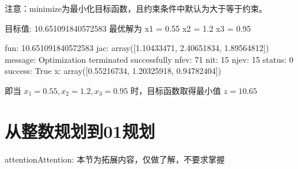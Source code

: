\documentclass[letterpaper,10pt,english]{sphinxmanual}
\begin{document}
注意：minimize为最小化目标函数，且约束条件中默认为大于等于约束。


\begin{sphinxVerbatim}[commandchars=\\\{\}]
  

  
  \PYG{p}{[}\PYG{p}{]}
  \PYG{p}{[}\PYG{p}{]}
  \PYG{p}{[}\PYG{p}{]}
\end{sphinxVerbatim}

\begin{sphinxVerbatim}[commandchars=\\\{\}]
目标值: 10.651091840572583
最优解为
x1 = 0.55
x2 = 1.2
x3 = 0.95
\end{sphinxVerbatim}

\begin{sphinxVerbatim}[commandchars=\\\{\}]
     fun: 10.651091840572583
     jac: array([1.10433471, 2.40651834, 1.89564812])
 message: \PYGZsq{}Optimization terminated successfully\PYGZsq{}
    nfev: 71
     nit: 15
    njev: 15
  status: 0
 success: True
       x: array([0.55216734, 1.20325918, 0.94782404])
\end{sphinxVerbatim}

即当 \(x_1 = 0.55, x_2 = 1.2, x_3 = 0.95\) 时，目标函数取得最小值 \(z = 10.65\)


\section{从整数规划到0\sphinxhyphen{}1规划}
\label{\detokenize{docs/LP:id10}}
\begin{sphinxadmonition}{attention}{Attention:}
本节为拓展内容，仅做了解，不要求掌握
\end{sphinxadmonition}
\end{document}
